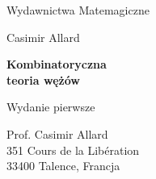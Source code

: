 

\usepackage{makeidx}
\usepackage{enumitem}
\usepackage{booktabs}
\usepackage{longtable}
\usepackage[table]{xcolor}
\usepackage[colorinlistoftodos,prependcaption]{todonotes}
\usepackage{tikz}
\usetikzlibrary{arrows.meta}
\usetikzlibrary{decorations.markings}
\usetikzlibrary{decorations.pathreplacing}
\usetikzlibrary{knots}



\let\oldtabular\tabular %
\let\endoldtabular\endtabular
\renewenvironment{tabular}
{\rowcolors{2}{white}{lightgray}\oldtabular}
{\endoldtabular}
\let\oldlongtable\longtable %
\let\endoldlongtable\endlongtable
\renewenvironment{longtable}
{\rowcolors{2}{white}{lightgray}\oldlongtable}
{\endoldlongtable}


\makeindex


\thispagestyle{empty}
{\noindent\fontsize{18pt}{18pt}\selectfont Wydawnictwa Matemagiczne}
\newpage

\thispagestyle{empty}
\phantom{nothing}
\newpage

\thispagestyle{empty}
{\noindent\fontsize{18pt}{18pt}\selectfont Casimir Allard}
\vspace{10mm}

{\noindent\fontsize{24pt}{24pt}\selectfont \textbf{Kombinatoryczna\\teoria wężów}}
\vspace{10mm}

{\noindent Wydanie pierwsze}
\vfill
{}
\newpage

\thispagestyle{empty}
{\noindent Prof. Casimir Allard\\
351 Cours de la Libération\\
33400 Talence, Francja}
\vspace{5mm}

